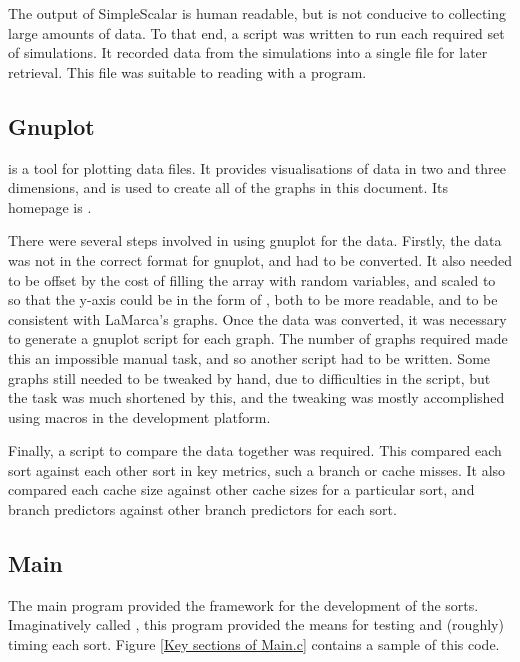 The output of SimpleScalar is human readable, but is not conducive to collecting
large amounts of data. To that end, a script was written to run each required
set of simulations. It recorded data from the simulations into a single file for
later retrieval. This file was suitable to reading with a  program.

\subsection{Gnuplot}
\label{Gnuplot}
 is a tool for plotting data files. It provides visualisations of
data in two and three dimensions, and is used to create all of the graphs in
this document. Its homepage is .

There were several steps involved in using gnuplot for the data. Firstly, the
data was not in the correct format for gnuplot, and had to be converted. It also
needed to be offset by the cost of filling the array with random variables, and
scaled to so that the y-axis could be in the form of ,
both to be more readable, and to be consistent with LaMarca's graphs. Once the
data was converted, it was necessary to generate a gnuplot script for each
graph.  The number of graphs required made this an impossible manual task, and
so another script had to be written.  Some graphs still needed to be tweaked by
hand, due to difficulties in the script, but the task was much shortened by
this, and the tweaking was mostly accomplished using macros in the development
platform.

Finally, a script to compare the data together was required.  This compared each
sort against each other sort in key metrics, such a branch or cache misses. It
also compared each cache size against other cache sizes for a particular sort,
and branch predictors against other branch predictors for each sort. 

\subsection{Main}
\label{Main}

The main program provided the framework for the development of the sorts.
Imaginatively called , this program provided the means for testing
and (roughly) timing each sort. Figure \vref{Key sections of Main.c} contains a
sample of this code.


